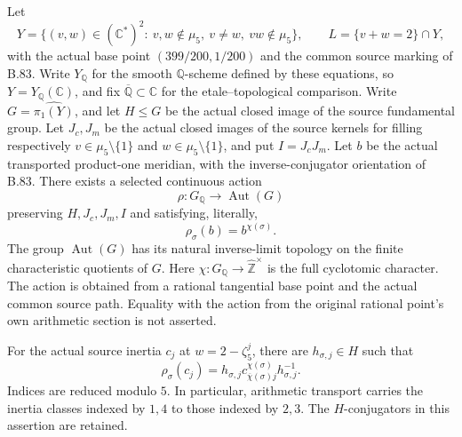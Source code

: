 \label{stmt:B85}

Let
\[
 Y=\{(v,w)\in(\mathbb C^*)^2:\ v,w\notin\mu _5,
       \ v\ne w,\ vw\notin\mu _5\},
 \qquad L=\{v+w=2\}\cap Y,
\]
with the actual base point $(399/200,1/200)$ and the common source
marking of B.83. Write $Y_{\mathbb Q}$ for the smooth $\mathbb Q$-scheme
defined by these equations, so $Y=Y_{\mathbb Q}(\mathbb C)$, and fix
$\overline{\mathbb Q}\subset\mathbb C$ for the etale--topological comparison. Write $G=\widehat{\pi _1(Y)}$, and let $H\leq G$
be the actual closed image of the source fundamental group. Let $J_c,J_m$
be the actual closed images of the source kernels for filling respectively
$v\in\mu _5\setminus\{1\}$ and $w\in\mu _5\setminus\{1\}$, and
put $I=J_cJ_m$. Let $b$ be the actual transported product-one meridian,
with the inverse-conjugator orientation of B.83. There exists a selected
continuous action
\[
 \rho:G_{\mathbb Q}\longrightarrow\operatorname{Aut}(G)
\]
preserving $H,J_c,J_m,I$ and satisfying, literally,
\begin{equation}\label{eq:B85-cyclotomy}
 \rho_\sigma(b)=b^{\chi(\sigma)}.
\end{equation}
The group $\operatorname{Aut}(G)$ has its natural inverse-limit topology
on the finite characteristic quotients of $G$.
Here $\chi:G_{\mathbb Q}\to\widehat{\mathbb Z}^{\times}$ is the full
cyclotomic character. The action is obtained from a rational tangential
base point and the actual common source path. Equality with the action
from the original rational point's own arithmetic section is not asserted.

For the actual source inertia $c_j$ at $w=2-\zeta _5^j$, there are
$h_{\sigma,j}\in H$ such that
\begin{equation}\label{eq:B85-source-inertia}
 \rho_\sigma(c_j)=h_{\sigma,j}
 c_{\overline\chi(\sigma)j}^{\chi(\sigma)}h_{\sigma,j}^{-1}.
\end{equation}
Indices are reduced modulo $5$. In particular, arithmetic transport
carries the inertia classes indexed by $1,4$ to those indexed by $2,3$.
The $H$-conjugators in this assertion are retained.

